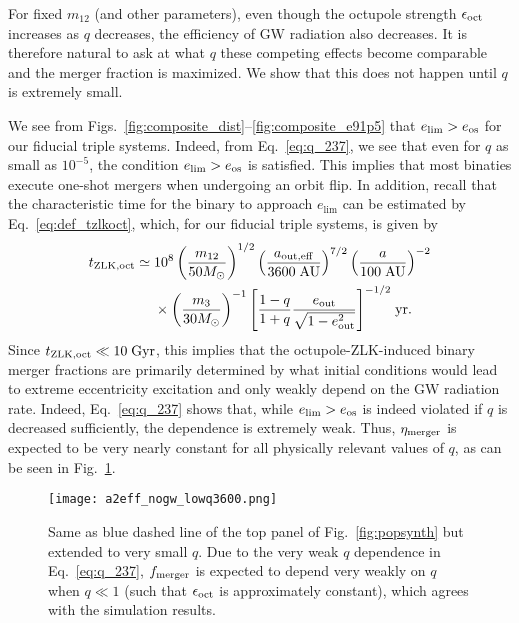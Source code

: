 \documentclass[
        fleqn,
        usenatbib,
    ]{mnras}
\newcommand*{\p}[1]{\left(#1\right)}
\begin{document}
For fixed $m_{12}$ (and other parameters), even though the octupole strength
$\epsilon_{\rm oct}$ increases as $q$ decreases, the efficiency of GW
radiation also decreases. It is therefore natural to ask at what $q$ these
competing effects become comparable and the merger fraction is maximized. We
show that this does not happen until $q$ is extremely small.

We see from Figs.~\ref{fig:composite_dist}--\ref{fig:composite_e91p5} that
$e_{\lim} > e_{\rm os}$ for our fiducial triple systems. Indeed,
from Eq.~\eqref{eq:q_237}, we see that even for $q$ as small as $10^{-5}$, the
condition $e_{\lim} > e_{\rm os}$ is satisfied. This implies that most binaties
execute one-shot mergers when undergoing an orbit flip. In addition, recall that
the characteristic time for the binary to approach $e_{\lim}$ can be estimated
by Eq.~\eqref{eq:def_tzlkoct}, which, for our fiducial triple systems, is given
by
\begin{align}
    t_{\rm ZLK, oct} \simeq{}& 10^8
        \p{\frac{m_{12}}{50M_{\odot}}}^{1/2}
        \p{\frac{a_{\rm out, eff}}{3600\;\mathrm{AU}}}^{7/2}
        \p{\frac{a}{100\;\mathrm{AU}}}^{-2}\nonumber\\
        &\times \p{\frac{m_3}{30M_{\odot}}}^{-1}
            \Bigg[\frac{1 - q}{1 + q}\frac{e_{\rm out}}{\sqrt{1 - e_{\rm out}^2}}
            \Bigg]^{-1/2}
            \;\mathrm{yr}.
\end{align}
Since $t_{\rm ZLK, oct } \ll 10\;\mathrm{Gyr}$, this implies that the
octupole-ZLK-induced binary merger fractions are primarily determined by what
initial conditions would lead to extreme eccentricity excitation and only weakly
depend on the GW radiation rate. Indeed, Eq.~\eqref{eq:q_237} shows that, while
$e_{\lim} > e_{\rm os}$ is indeed violated if $q$ is decreased sufficiently, the
dependence is extremely weak. Thus, $\eta_{\rm merger}$ is expected to be very
nearly constant for all physically relevant values of $q$, as can be seen in
Fig.~\ref{fig:popsynth_lowq}.
\begin{figure}
    \centering
    \texttt{[image: a2eff\_nogw\_lowq3600.png]}
    \caption{Same as blue dashed line of the top panel of
    Fig.~\ref{fig:popsynth} but extended to very small $q$. Due to the very weak
    $q$ dependence in Eq.~\eqref{eq:q_237}, $f_{\rm merger}$ is expected to
    depend very weakly on $q$ when $q \ll 1$ (such that $\epsilon_{\rm oct}$ is
    approximately constant), which agrees with the simulation
    results.}\label{fig:popsynth_lowq}
\end{figure}
\end{document}
